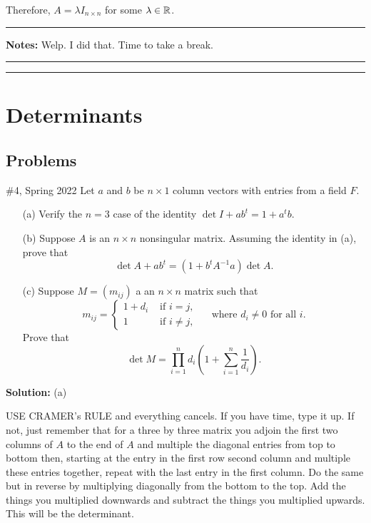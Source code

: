 \documentclass{article}
\begin{document}
Therefore, $A = \lambda I_{n\times n}$ for some $\lambda \in \mathbb R$.\\

\hrule

\textbf{Notes:} Welp. I did that. Time to take a break.\\

\hrule \vspace{2pt}
\hrule


\break

\section{Determinants}

\subsection{Problems}

\begin{problem}{\#4, Spring 2022} Let $a$ and $b$ be $n\times 1$ column vectors with entries from a field $F$. 
	\begin{enumerate}
		\item[(a)] Verify the $n = 3$ case of the identity $\det{I + ab^t} = 1 + a^tb$.
		\item[(b)] Suppose $A$ is an $n\times n$ nonsingular matrix. Assuming the identity in (a), prove that 
				\[\det{A + ab^t} = (1+ b^t A^{-1} a )\det{A}.\]
		\item[(c)] Suppose $M = (m_{ij})$ a an $n\times n$ matrix such that 
				\[ m_{ij} = \begin{cases}
							1 + d_i & \text{ if } i = j,\\
							1 & \text{ if } i \neq j,
						\end{cases}
						\quad \text{ where } d_i \neq 0 \text{ for all } i.\]
			Prove that 
				\[\det{M} = \prod_{i=1}^n d_i \left( 1 + \sum_{i=1}^n \frac{1}{d_i} \right).\]
		\end{enumerate}
\end{problem}

\textbf{Solution:} (a)

USE CRAMER's RULE and everything cancels. If you have time, type it up. If not, just remember that for a three by three matrix you adjoin the first two columns of $A$ to the end of $A$ and multiple the diagonal entries from top to bottom then, starting at the entry in the first row second column and multiple these entries together, repeat with the last entry in the first column. Do the same but in reverse by multiplying diagonally from the bottom to the top. Add the things you multiplied downwards and subtract the things you multiplied upwards. This will be the determinant. 
\end{document}
